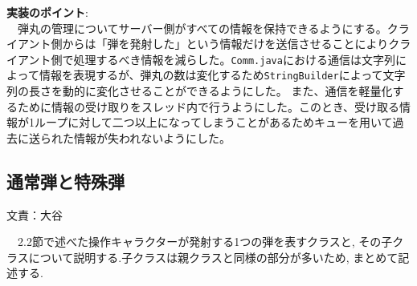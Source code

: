 \documentclass[11pt,a4j]{jarticle}
\begin{document}
\noindent\textbf{実装のポイント}: \\　弾丸の管理についてサーバー側がすべての情報を保持できるようにする。クライアント側からは「弾を発射した」という情報だけを送信させることによりクライアント側で処理するべき情報を減らした。\texttt{Comm.java}における通信は文字列によって情報を表現するが、弾丸の数は変化するため\texttt{StringBuilder}によって文字列の長さを動的に変化させることができるようにした。
また、通信を軽量化するために情報の受け取りをスレッド内で行うようにした。このとき、受け取る情報が1ループに対して二つ以上になってしまうことがあるためキューを用いて過去に送られた情報が失われないようにした。

\subsection{通常弾と特殊弾}
\begin{flushright}
  文責：大谷
\end{flushright}
　2.2節で述べた操作キャラクターが発射する1つの弾を表すクラスと, その子クラスについて説明する.子クラスは親クラスと同様の部分が多いため, まとめて記述する.
\end{document}

